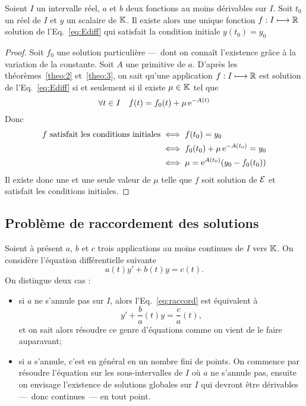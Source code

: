 %
\begin{theo} 
  \label{theo:4}
  Soient $I$ un intervalle réel, $a$ et $b$ deux fonctions au moins dérivables sur $I$. Soit $t_0$ un réel de $I$ et $y$ un scalaire de $\mathbb{K}$. Il existe alors une unique fonction $f:I \longmapsto \mathbb{R}$ solution de l'Eq.~\eqref{eq:Ediff} qui satisfait la condition initiale $y(t_0)=y_0$
\end{theo}
\begin{proof}
  Soit $f_0$ une solution particulière ---~dont on connaît l'existence grâce à la variation de la constante. Soit $A$ une primitive de $a$. D'après les théorèmes~\ref{theo:2} et~\ref{theo:3}, on sait qu'une application $f:I \longmapsto \mathbb{R}$ est solution de l'Eq.~\eqref{eq:Ediff} si et seulement si il existe $\mu \in \mathbb{K}$ tel que
  \begin{equation}
    \forall t \in I \quad f(t)=f_0(t) + \mu \operatorname{e}^{-A(t)}
  \end{equation}
Donc 
\begin{align}
  f \text{~satisfait les conditions initiales} & \iff f(t_0)=y_0 \\ & \iff f_0(t_0)+\mu\operatorname{e}^{-A(t_0)} = y_0 \\ & \iff \mu = \operatorname{e}^{A(t_0)}(y_0-f_0(t_0))
\end{align}
Il existe donc une et une seule valeur de $\mu$ telle que $f$ soit solution de $\mathcal{E}$ et satisfait les conditions initiales.
\end{proof}

\subsection{Problème de raccordement des solutions}
\label{subsec:pbmraccordement}
Soient à présent $a$, $b$ et $c$ trois applications au moins continues de $I$ vers $\mathbb{K}$. On considère l'équation différentielle suivante
\begin{equation}
  \label{eq:raccord}
  a(t) y'+b(t)y=c(t).
\end{equation}
On distingue deux cas :
\begin{itemize}
\item si $a$ ne s'annule pas sur $I$, alors l'Eq.~\eqref{eq:raccord} est équivalent à
  \begin{equation}
    y' + \frac{b}{a}(t) y = \frac{c}{a}(t),
  \end{equation}
et on sait alors résoudre ce genre d'équations comme on vient de le faire auparavant;
\item si $a$ s'annule, c'est en général en un nombre fini de points. On commence par résoudre l'équation sur les sous-intervalles de $I$ où $a$ ne s'annule pas, ensuite on envisage l'existence de solutions globales sur $I$ qui devront être dérivables ---~donc continues~--- en tout point.
\end{itemize}
%
